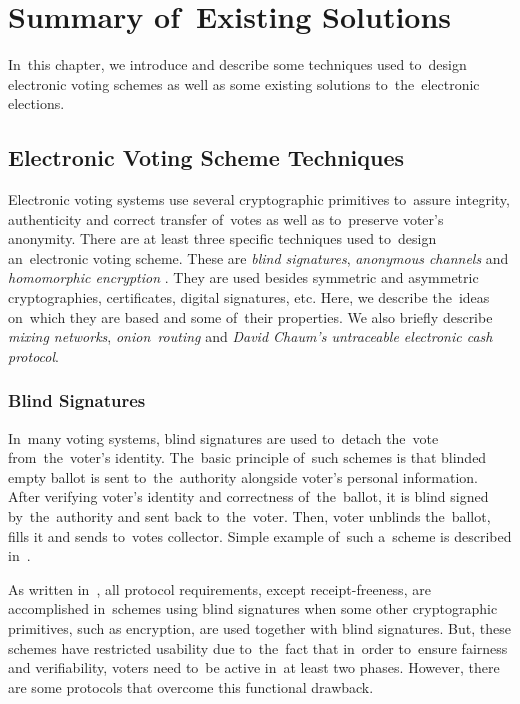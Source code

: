 \chapter{Summary of~Existing Solutions}
\label{kap:existing}
In~this chapter, we introduce and describe some techniques used to~design electronic voting schemes as well as some existing solutions to~the~electronic elections. 

\section{Electronic Voting Scheme Techniques}

Electronic voting systems use several cryptographic primitives to~assure integrity, authenticity and correct transfer of~votes as well as to~preserve voter's anonymity. There are at least three specific techniques used to~design an~electronic voting scheme. These are \emph{blind signatures}, \emph{anonymous channels} and \emph{homomorphic encryption} \cite{Haenni}. They are used besides symmetric and asymmetric cryptographies, certificates, digital signatures, etc. Here, we describe the~ideas on~which they are based and some of~their properties. We also briefly describe \emph{mixing networks}, \emph{onion~routing} and \emph{David Chaum's untraceable electronic cash protocol}.

\subsection{Blind Signatures}
In~many voting systems, blind signatures are used to~detach the~vote from~the~voter's identity. The~basic principle of~such schemes is that blinded empty ballot is sent to~the~authority alongside voter's personal information. After verifying voter's identity and correctness of~the~ballot, it is blind signed by~the~authority and sent back to~the~voter. Then, voter unblinds the~ballot, fills it and sends to~votes collector. Simple example of~such a~scheme is described in~\cite{Standford}.

As written in~\cite{Haenni}, all protocol requirements, except receipt-freeness, are accomplished in~schemes using blind signatures when some other cryptographic primitives, such as encryption, are used together with blind signatures. But, these schemes have restricted usability due to~the~fact that in~order to~ensure fairness and verifiability, voters need to~be active in~at least two phases. %
However, there are some protocols that overcome this functional drawback.
